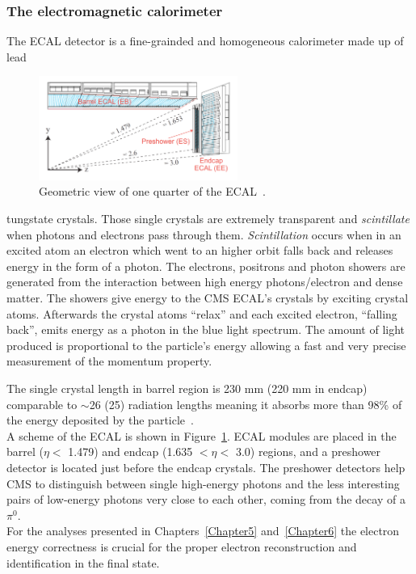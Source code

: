 \subsubsection{The electromagnetic calorimeter}
The ECAL detector is a fine-grainded and homogeneous calorimeter
made up of lead
\begin{figure}
  \begin{center}
    \includegraphics[clip,trim=1cm 1cm 1cm 1.5cm, width=0.58\textwidth]{Figures/c2/ecal}
  \end{center}
  \caption{Geometric view of one quarter of the ECAL~\cite{Benaglia_2014}.}
\label{fig:ecal}
\end{figure}
 tungstate crystals. Those single crystals are extremely transparent
 and \emph{scintillate} when photons and electrons pass through
 them. \emph{Scintillation} occurs when in an excited atom an electron
 which went to an higher orbit falls back and
 releases energy in the form of a photon. The electrons, positrons and
 photon showers are generated from the interaction between high energy photons/electron and
 dense matter. The showers give energy to the CMS ECAL's crystals by
 exciting crystal atoms. Afterwards the crystal atoms ``relax'' and each
 excited electron, ``falling back'',
 emits energy as a photon in the blue light spectrum.
The amount of light produced is proportional to the particle's energy
 allowing a fast and very precise measurement of the momentum
 property. 

The single crystal length in barrel region is 230 mm (220
 mm in endcap) comparable to $\sim$26 (25) radiation lengths meaning it
 absorbs more than 98\% of the energy deposited by the particle~\cite{Biino_2015}.\\
A scheme of the ECAL is shown in Figure~\ref{fig:ecal}.
ECAL modules are placed in the barrel ($\eta<$ 1.479) and endcap
(1.635 $<\eta<$ 3.0) regions, and a preshower detector is located just
before the endcap crystals. The preshower detectors help CMS to
distinguish between single high-energy photons and the less
interesting pairs of low-energy photons very close to each other, \ie
coming from the decay of a $\pi^0$. \\
For the analyses presented in Chapters~\ref{Chapter5}
and~\ref{Chapter6} the electron energy correctness is crucial for the
proper electron reconstruction and identification in the final
state. 

